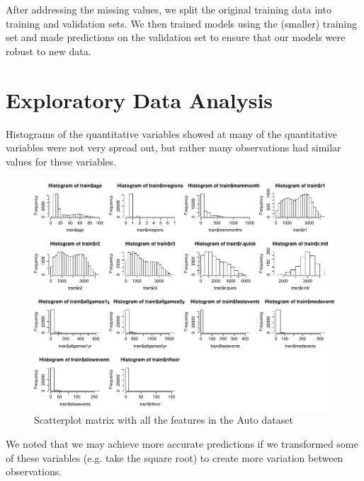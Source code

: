 \documentclass[12pt]{article}
\begin{document}
After addressing the missing values, we split the original training data into training and validation sets.  We then trained models using the (smaller) training set and made predictions on the validation set to ensure that our models were robust to new data.

\section {Exploratory Data Analysis}
Histograms of the quantitative variables showed at many of the quantitative variables were not very spread out, but rather many observations had similar values for these variables.
  \FloatBarrier
  \begin{figure}[!ht]
    \centering
    \includegraphics[width=\textwidth]{histograms_of_quant_vars}
    \caption{Scatterplot matrix with all the features in the Auto dataset}
  \end{figure}
  \FloatBarrier
We noted that we may achieve more accurate predictions if we transformed some of these variables (e.g. take the square root) to create more variation between observations.
\end{document}
